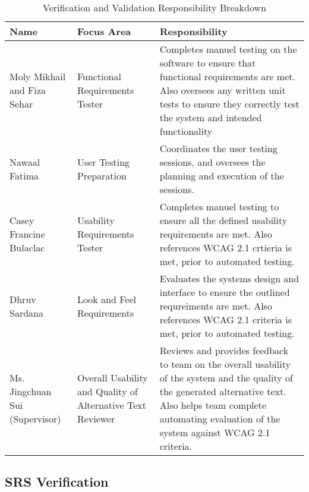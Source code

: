 \documentclass[12pt, titlepage]{article}
\begin{document}
\begin{table}[H]
    \centering
    \caption{Verification and Validation Responsibility Breakdown}
    \label{tab:data-dictionary-reading4all}
    \begin{tabular}{ |p{3.0cm}|p{3.8cm}|p{7.3cm}| }
      \hline
      \textbf{Name} & \textbf{ Focus Area } & \textbf{Responsibility} \\
      \hline
      Moly Mikhail and Fiza Sehar & Functional Requirements Tester & Completes manuel testing on the software to ensure that functional requirements are met. Also oversees any written unit tests to ensure they correctly test the system and intended functionality \\
      \hline
      Nawaal Fatima & User Testing Preparation & Coordinates the user testing sessions, and oversees the planning and execution of the sessions. \\
      \hline 
      Casey Francine Bulaclac & Usability Requirements Tester & Completes manuel testing to ensure all the defined usability requirements are met. Also references WCAG 2.1 crtieria is met, prior to automated testing. \\
      \hline 
      Dhruv Sardana & Look and Feel Requirements & Evaluates the systems design and interface to ensure the outlined requreiments are met. Also references WCAG 2.1 criteria is met, prior to automated testing. \\
      \hline 
      Ms. Jingchuan Sui (Supervisor) & Overall Usability and Quality of Alternative Text Reviewer & Reviews and provides feedback to team on the overall usability of the system and the quality of the generated alternative text. Also helps team complete automating evaluation of the system against WCAG 2.1 criteria. \\ 
      \hline
    \end{tabular}
  \end{table}
  
  
\subsection{SRS Verification}


\end{document}
